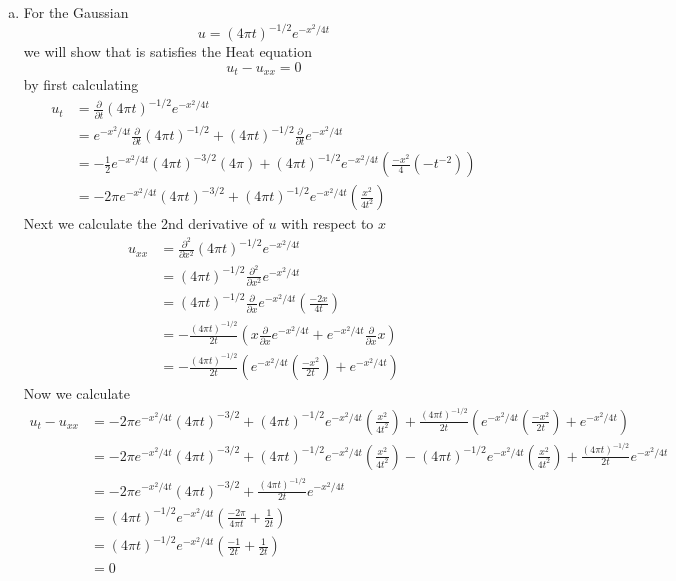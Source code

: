 \documentclass[11pt]{article}
\numberwithin{equation}{section}
\begin{document}
\begin{enumerate}[(a)]
\item
For the Gaussian 
$$u = (4\pi t)^{-1/2}e^{-x^2/4t}$$
we will show that is satisfies the Heat equation
$$u_t - u_{xx} = 0$$
by first calculating
\begin{align*}
u_t &= \frac{\partial}{\partial t}(4\pi t)^{-1/2}e^{-x^2/4t} \\
&= e^{-x^2/4t}\frac{\partial}{\partial t}(4\pi t)^{-1/2} + (4\pi t)^{-1/2}\frac{\partial}{\partial t}e^{-x^2/4t} \\
&= -\frac{1}{2}e^{-x^2/4t}(4\pi t)^{-3/2}(4\pi) + (4\pi t)^{-1/2}e^{-x^2/4t}\left(\frac{-x^2}{4}(-t^{-2})\right) \\
&= -2\pi e^{-x^2/4t}(4\pi t)^{-3/2} + (4\pi t)^{-1/2}e^{-x^2/4t}\left(\frac{x^2}{4t^2}\right)
\end{align*}
Next we calculate the 2nd derivative of $u$ with respect to $x$
\begin{align*}
u_{xx} &=  \frac{\partial^2}{\partial x^2}(4\pi t)^{-1/2}e^{-x^2/4t} \\
&=  (4\pi t)^{-1/2}\frac{\partial^2}{\partial x^2}e^{-x^2/4t} \\
&=  (4\pi t)^{-1/2}\frac{\partial}{\partial x}e^{-x^2/4t}\left(\frac{-2x}{4t}\right) \\
&=  -\frac{(4\pi t)^{-1/2}}{2t}\left(x\frac{\partial}{\partial x}e^{-x^2/4t} + e^{-x^2/4t}\frac{\partial}{\partial x}x \right) \\
&=  -\frac{(4\pi t)^{-1/2}}{2t}\left(e^{-x^2/4t}\left(\frac{-x^2}{2t}\right) + e^{-x^2/4t}\right) 
\end{align*}
Now we calculate
\begin{align*}
u_t - u_{xx} &= -2\pi e^{-x^2/4t}(4\pi t)^{-3/2} + (4\pi t)^{-1/2}e^{-x^2/4t}\left(\frac{x^2}{4t^2}\right) + \frac{(4\pi t)^{-1/2}}{2t}\left(e^{-x^2/4t}\left(\frac{-x^2}{2t}\right) + e^{-x^2/4t}\right) \\
&= -2\pi e^{-x^2/4t}(4\pi t)^{-3/2} + (4\pi t)^{-1/2}e^{-x^2/4t}\left(\frac{x^2}{4t^2}\right) - (4\pi t)^{-1/2}e^{-x^2/4t}\left(\frac{x^2}{4t^2}\right) + \frac{(4\pi t)^{-1/2}}{2t}e^{-x^2/4t} \\
&= -2\pi e^{-x^2/4t}(4\pi t)^{-3/2}  + \frac{(4\pi t)^{-1/2}}{2t}e^{-x^2/4t} \\
&= (4\pi t)^{-1/2}e^{-x^2/4t}\left(\frac{-2\pi}{4\pi t}  + \frac{1}{2t}\right)\\
&= (4\pi t)^{-1/2}e^{-x^2/4t}\left(\frac{-1}{2t}  + \frac{1}{2t}\right)\\
&= 0
\end{align*}


\end{enumerate}
\end{document}
